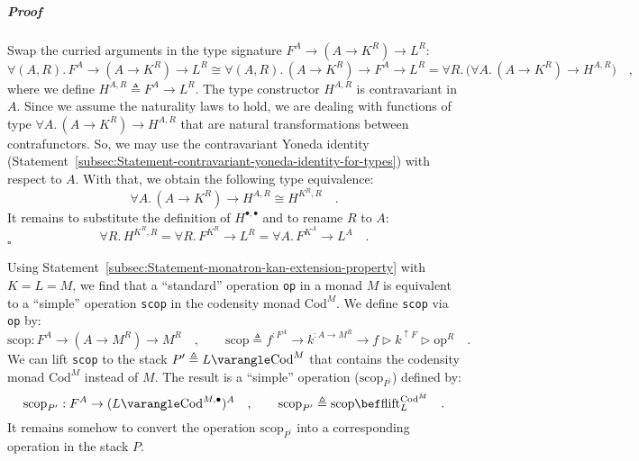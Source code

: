 \subparagraph{Proof}

Swap the curried arguments in the type signature $F^{A}\rightarrow(A\rightarrow K^{R})\rightarrow L^{R}$:
\[
\forall(A,R).\,F^{A}\rightarrow(A\rightarrow K^{R})\rightarrow L^{R}\cong\forall(A,R).\,(A\rightarrow K^{R})\rightarrow F^{A}\rightarrow L^{R}=\forall R.\,\big(\forall A.\,(A\rightarrow K^{R})\rightarrow H^{A,R}\big)\quad,
\]
where we define $H^{A,R}\triangleq F^{A}\rightarrow L^{R}$. The type
constructor $H^{A,R}$ is contravariant in $A$. Since we assume the
naturality laws to hold, we are dealing with functions of type $\forall A.\,(A\rightarrow K^{R})\rightarrow H^{A,R}$
that are natural transformations between contrafunctors. So, we may
use the contravariant Yoneda identity (Statement~\ref{subsec:Statement-contravariant-yoneda-identity-for-types})
with respect to $A$. With that, we obtain the following type equivalence:
\[
\forall A.\,(A\rightarrow K^{R})\rightarrow H^{A,R}\cong H^{K^{R},R}\quad.
\]
It remains to substitute the definition of $H^{\bullet,\bullet}$
and to rename $R$ to $A$:
\[
\forall R.\,H^{K^{R},R}=\forall R.\,F^{K^{R}}\rightarrow L^{R}=\forall A.\,F^{K^{A}}\rightarrow L^{A}\quad.
\]
$\square$

Using Statement~\ref{subsec:Statement-monatron-kan-extension-property}
with $K=L=M$, we find that a \textsf{``}standard\textsf{''} operation \lstinline!op!
in a monad $M$ is equivalent to a \textsf{``}simple\textsf{''} operation \lstinline!scop!
in the codensity monad $\text{Cod}^{M}$. We define \lstinline!scop!
via \lstinline!op! by:
\begin{equation}
\text{scop}:F^{A}\rightarrow(A\rightarrow M^{R})\rightarrow M^{R}\quad,\quad\quad\text{scop}\triangleq f^{:F^{A}}\rightarrow k^{:A\rightarrow M^{R}}\rightarrow f\triangleright k^{\uparrow F}\triangleright\text{op}^{R}\quad.\label{eq:monatron-scop-via-op}
\end{equation}
We can lift \lstinline!scop! to the stack $P^{\prime}\triangleq L\varangle\text{Cod}^{M}$
that contains the codensity monad $\text{Cod}^{M}$ instead of $M$.
The result is a \textsf{``}simple\textsf{''} operation ($\text{scop}_{P^{\prime}}$)
defined by:
\[
\text{scop}_{P^{\prime}}:F^{A}\rightarrow(L\varangle\text{Cod}^{M,\bullet})^{A}\quad,\quad\quad\text{scop}_{P^{\prime}}\triangleq\text{scop}\bef\text{flift}_{L}^{\text{Cod}^{M}}\quad.
\]
It remains somehow to convert the operation $\text{scop}_{P^{\prime}}$
into a corresponding operation in the stack $P$.

